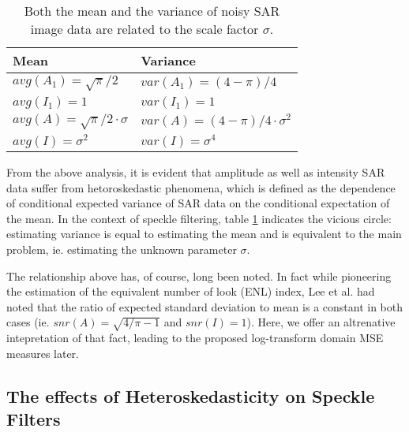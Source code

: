 \documentclass[journal]{IEEEtran}
\begin{document}
\begin{table}[!h]
\caption{Both the mean and the variance of noisy SAR image data are related to the scale factor $\sigma$.}
\label{tbl:orginal_sar_avg_var}
\normalsize
\centering
\begin{tabular}{|l|l|}
\hline
Mean & Variance \\
\hline
$avg(A_1) = { \sqrt{\pi}}/{2}$ & $var(A_1) = {(4-\pi)}/{4}$ \\
$avg(I_1) = 1$ & $var(I_1) = 1$ \\
$avg(A) = {\sqrt{\pi}}/{2} \cdot \sigma $ & $var(A) = {(4-\pi)}/{4} \cdot \sigma^2 $ \\
$avg(I) = \sigma^2 $ & $ var(I) = \sigma^4$ \\
\hline
\end{tabular}
\end{table}

From the above analysis, it is evident that amplitude as well as intensity SAR data suffer from hetoroskedastic phenomena, which is defined as the dependence of conditional expected variance of SAR data on the conditional expectation of the mean. In the context of speckle filtering, table \ref{tbl:orginal_sar_avg_var} indicates the vicious circle: estimating variance is equal to estimating the mean and is equivalent to the main problem, ie. estimating the unknown parameter $\sigma$. 

The relationship above has, of course, long been noted. In fact while pioneering the estimation of the equivalent number of look (ENL) index, Lee et al. had noted that the ratio of expected standard deviation to mean is a constant in both cases (ie. $snr(A)=\sqrt{{4}/{\pi}-1}$ and $snr(I)=1$). Here, we offer an altrenative intepretation of that fact, leading to the proposed log-transform domain MSE measures later.

\subsection{ The effects of Heteroskedasticity on Speckle Filters }
\end{document}
